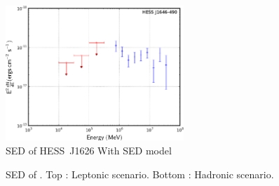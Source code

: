 \begin{figure}[h!]
\centering
\includegraphics[width=0.60\textwidth]{figures/HESSJ1626.eps}
\caption{SED of HESS~J1626 With SED model
\label{fig:1626}}
\end{figure}

\begin{figure}[h!]
\centering
{}
\caption{SED of . Top : Leptonic scenario. Bottom : Hadronic scenario. 
}

\end{figure}